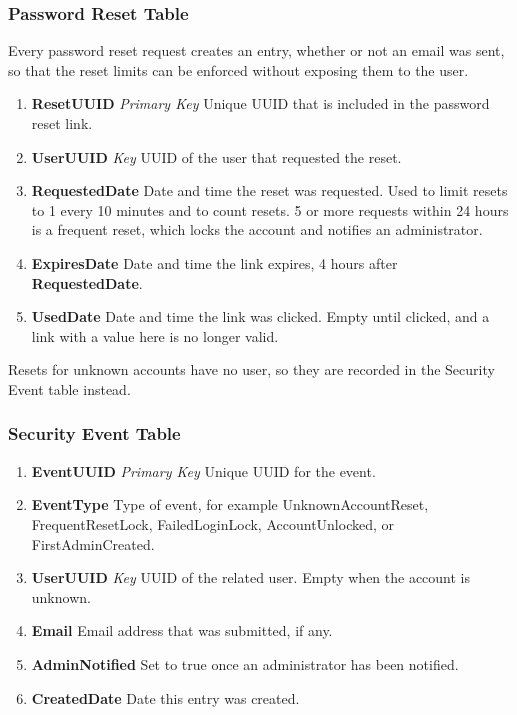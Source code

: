         \subsubsection{Password Reset Table}
        Every password reset request creates an entry, whether or not an email was sent, so that the reset limits can be enforced without exposing them to the user.
            \begin{enumerate}[leftmargin=3\parindent]
                \item \textbf{ResetUUID} \textit{Primary Key} Unique UUID that is included in the password reset link.
                \item \textbf{UserUUID} \textit{Key} UUID of the user that requested the reset.
                \item \textbf{RequestedDate} Date and time the reset was requested. Used to limit resets to 1 every 10 minutes and to count resets. 5 or more requests within 24 hours is a frequent reset, which locks the account and notifies an administrator.
                \item \textbf{ExpiresDate} Date and time the link expires, 4 hours after \textbf{RequestedDate}.
                \item \textbf{UsedDate} Date and time the link was clicked. Empty until clicked, and a link with a value here is no longer valid.
            \end{enumerate}
            Resets for unknown accounts have no user, so they are recorded in the Security Event table instead.

        \subsubsection{Security Event Table}
            \begin{enumerate}[leftmargin=3\parindent]
                \item \textbf{EventUUID} \textit{Primary Key} Unique UUID for the event.
                \item \textbf{EventType} Type of event, for example UnknownAccountReset, FrequentResetLock, FailedLoginLock, AccountUnlocked, or FirstAdminCreated.
                \item \textbf{UserUUID} \textit{Key} UUID of the related user. Empty when the account is unknown.
                \item \textbf{Email} Email address that was submitted, if any.
                \item \textbf{AdminNotified} Set to true once an administrator has been notified.
                \item \textbf{CreatedDate} Date this entry was created.
            \end{enumerate}
\newpage %
